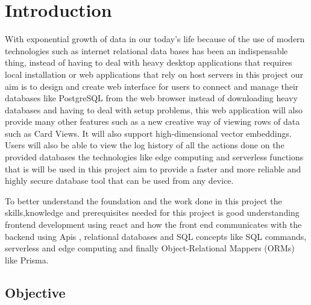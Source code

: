 \chapter{Introduction}


With exponential growth of data in our today's life because of the use of modern technologies such as internet relational data bases has been an indispensable thing, instead of having to deal with heavy desktop applications that requires local installation or web applications that rely on host servers in this project our aim is to design and create web interface for users to connect and manage their databases like PostgreSQL from the web browser instead of downloading heavy databases and having to deal with setup problems, this web application will also provide many other features such as a new creative way of viewing rows of data such as Card Views. It will also support high-dimensional vector embeddings. Users will also be able to view the log history of all the actions done on the provided databases the technologies like edge computing and serverless functions that is will be used in this project aim to provide a faster and more reliable and highly secure database tool that can be used from any device. 

 To better understand the foundation and the work done in this project the skills,knowledge and prerequisites needed for this project is good understanding frontend development using react and how the front end communicates with the backend using Apis , relational databases and SQL concepts like SQL commands, serverless and edge computing and finally Object-Relational Mappers (ORMs) like Prisma.
\section{Objective}




